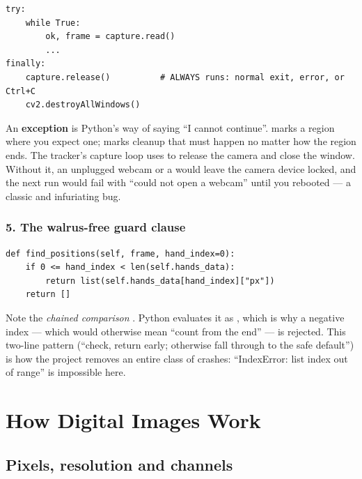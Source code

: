 \begin{codecard}
\begin{lstlisting}
try:
    while True:
        ok, frame = capture.read()
        ...
finally:
    capture.release()          # ALWAYS runs: normal exit, error, or Ctrl+C
    cv2.destroyAllWindows()
\end{lstlisting}
\end{codecard}

An \textbf{exception} is Python's way of saying ``I cannot continue''.  marks a region
where you expect one;  marks cleanup that must happen no matter how the region ends.
The tracker's capture loop uses  to release the camera and close the window. Without
it, an unplugged webcam or a  would leave the camera device locked, and the next run
would fail with ``could not open a webcam'' until you rebooted --- a classic and infuriating bug.

\subsubsection*{5. The walrus-free guard clause}

\begin{codecard}
\begin{lstlisting}
def find_positions(self, frame, hand_index=0):
    if 0 <= hand_index < len(self.hands_data):
        return list(self.hands_data[hand_index]["px"])
    return []
\end{lstlisting}
\end{codecard}

Note the \emph{chained comparison} . Python evaluates it as
, which is why a negative index --- which would otherwise mean
``count from the end'' --- is rejected. This two-line pattern (``check, return early; otherwise fall
through to the safe default'') is how the project removes an entire class of crashes:
``IndexError: list index out of range'' is impossible here.

\section{How Digital Images Work}
\label{sec:images}

\subsection{Pixels, resolution and channels}

